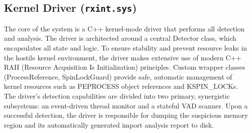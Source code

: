 \documentclass[journal]{IEEEtran}
\begin{document}
\subsection{Kernel Driver (\texttt{rxint.sys})}
The core of the system is a C++ kernel-mode driver that performs all detection and analysis. The driver is architected around a central Detector class, which encapsulates all state and logic. To ensure stability and prevent resource leaks in the hostile kernel environment, the driver makes extensive use of modern C++ RAII (Resource Acquisition Is Initialization) principles. Custom wrapper classes (ProcessReference, SpinLockGuard) provide safe, automatic management of kernel resources such as PEPROCESS object references and KSPIN_LOCKs. The driver's detection capabilities are divided into two primary, synergistic subsystems: an event-driven thread monitor and a stateful VAD scanner. Upon a successful detection, the driver is responsible for dumping the suspicious memory region and its automatically generated import analysis report to disk.




\end{document}

